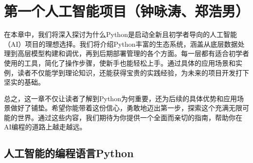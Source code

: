 \chapter{第一个人工智能项目（钟咏涛、郑浩男）}

在本章中，我们将深入探讨为什么Python是启动全新且初学者导向的人工智能（AI）项目的理想选择。我们将介绍Python丰富的生态系统，涵盖从底层数据处理到高层模型构建和调优，再到后期部署管理的各个方面。每一层都有适合初学者使用的工具，简化了操作步骤，使新手也能轻松上手。通过具体的应用场景和实例，读者不仅能学到理论知识，还能获得宝贵的实践经验，为未来的项目开发打下坚实的基础。

总之，这一章不仅让读者了解到Python为何重要，还为后续的具体优势和应用场景做好了铺垫。希望你能带着这份信心，勇敢地迈出第一步，探索这个充满无限可能的世界。通过这些内容，我们期待为你提供一个全面而亲切的指南，帮助你在AI编程的道路上越走越远。

\section{人工智能的编程语言Python}




